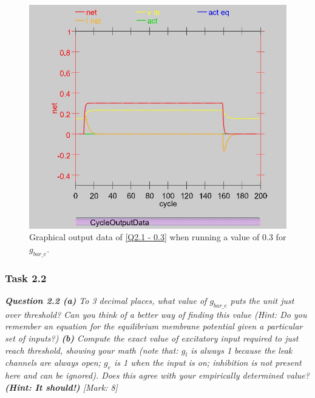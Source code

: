 \begin{multicols}{2}
\begin{figure}[H]
\centering
\includegraphics[scale=0.3]{Media/Main/EQ1/2.1.AbG.png}
\caption{Graphical output data of \cref{Q2.1 - 0.3} when running a value of 0.3 for $g_{bar\_e}$.}
\label{Q2.1 - 0.3G}
\end{figure}
\end{multicols}


\subsubsection{Task 2.2}
\label{Q1:Expl 2.6.1(2.2) SubSubSection}

\begin{tcolorbox}[colback=gray!20!white,colframe=gray!20!white]
  \emph{\textbf{Question 2.2 (a)} To 3 decimal places, what value of $g_{bar\_e}$ puts the unit just over threshold? Can you think of a better way of finding this value (Hint: Do you remember an equation for the equilibrium membrane potential given a particular set of inputs?) \textbf{(b)} Compute the exact value of excitatory input required to just reach threshold, showing your math (note that: $g_l$ is always 1 because the leak channels are always open; $g_e$ is 1 when the input is on; inhibition is not present here and can be ignored). Does this agree with your empirically determined value? \textbf{(Hint: It should!)} [Mark: 8]}
\end{tcolorbox} 
\vspace{0.5cm}

